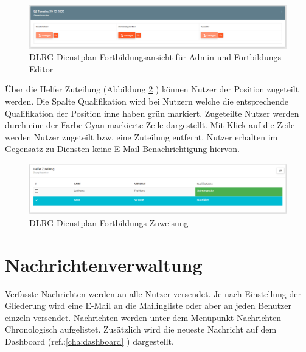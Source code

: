 \begin{figure}[h]
	\begin{addmargin}{-0.2\linewidth}
		\centering 
		\includegraphics[width=20cm]{Bilder/view_training_admin.png}
	\end{addmargin} 
	\caption[Gliederungsverwaltung]{DLRG Dienstplan Fortbildungsansicht für Admin und Fortbildungs-Editor}
	\label{fig:view_training_admin}
\end{figure}
Über die Helfer Zuteilung (Abbildung \ref{fig:view_training_assign} \textit{}) können Nutzer der Position zugeteilt werden. Die Spalte Qualifikation wird bei Nutzern welche die entsprechende Qualifikation der Position inne haben grün markiert. Zugeteilte Nutzer werden durch eine der Farbe Cyan markierte Zeile dargestellt. Mit Klick auf die Zeile werden Nutzer zugeteilt bzw. eine Zuteilung entfernt. Nutzer erhalten im Gegensatz zu Diensten keine E-Mail-Benachrichtigung hiervon.

\begin{figure}[h]
	\begin{addmargin}{-0.2\linewidth}
		\centering 
		\includegraphics[width=20cm]{Bilder/view_training_assign.png}
	\end{addmargin} 
	\caption[Gliederungsverwaltung]{DLRG Dienstplan Fortbildungs-Zuweisung}
	\label{fig:view_training_assign}
\end{figure}
		
\section{Nachrichtenverwaltung}
\label{sec:admin_news}
Verfasste Nachrichten werden an alle Nutzer versendet. Je nach Einstellung der Gliederung wird eine E-Mail an die Mailingliste oder aber an jeden Benutzer einzeln versendet.
Nachrichten werden unter dem Menüpunkt \glqq Nachrichten\grqq{} Chronologisch aufgelistet. Zusätzlich wird die neueste Nachricht auf dem Dashboard (ref.:\ref{cha:dashboard} ) dargestellt.